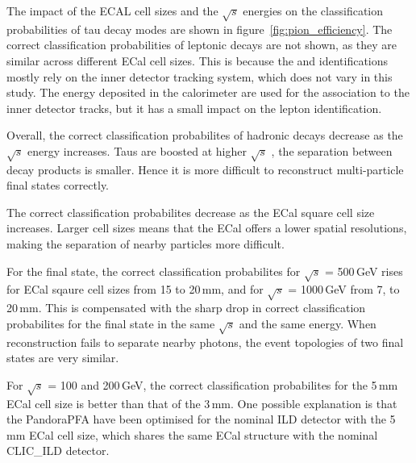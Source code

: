\documentclass[a4paper,11pt]{article}
\newcommand{\decayRho}{\PGrP{\PGpm\PGpz}\PGnGt}
\newcommand{\decayAiPhoton}{\PaDoP{\PGpm\PGpz\PGpz}\PGnGt}
\newcommand{\rootS}{\ensuremath{\sqrt{s}} }
\begin{document}
The impact of the ECAL cell sizes and the \rootS energies on the classification probabilities of tau decay modes are shown in figure~\ref{fig:pion_efficiency}. The correct classification probabilities of leptonic decays are not shown, as they are similar across different ECal cell sizes. This is because the \Pepm and \PGmpm identifications mostly rely on the inner detector tracking system, which does not vary in this study. The energy deposited in the calorimeter are used for the association to the inner detector tracks, but it has a small impact on the lepton identification. 

Overall, the correct classification probabilites of hadronic decays decrease as the \rootS energy increases. Taus are boosted at higher \rootS, the separation between decay products is smaller. Hence it is more difficult to reconstruct multi-particle final states correctly.

The correct classification probabilites decrease as the ECal square cell size increases. Larger cell sizes means that the ECal offers a lower spatial resolutions, making the separation of nearby particles more difficult.



For the \decayRho final state, the correct classification probabilites for \rootS = 500\,GeV rises for ECal sqaure cell sizes from 15 to 20\,mm, and for  \rootS = 1000\,GeV from 7, to 20\,mm. This is compensated with the sharp drop in correct classification probabilites for the \decayAiPhoton final state in the same \rootS and the same energy. When reconstruction fails to separate nearby photons, the event topologies of two final states are very similar.



For \rootS = 100 and 200\,GeV, the correct classification probabilites for the 5\,mm ECal cell size is better than that of the 3\,mm. One possible explanation is that the PandoraPFA have been optimised for the nominal ILD detector with the 5\,mm ECal cell size, which shares the same ECal structure with the nominal CLIC\_ILD detector.
\end{document}
